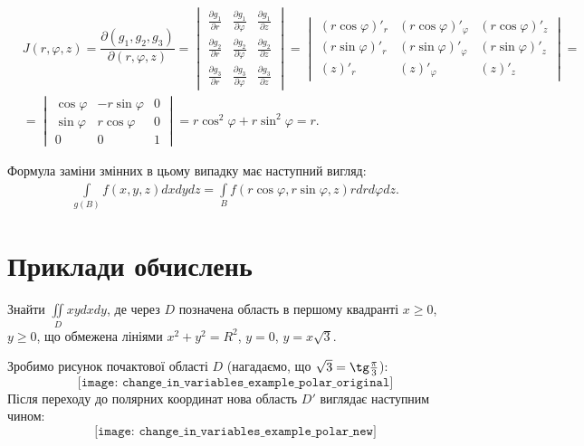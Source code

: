 \begin{align*}
&J(r, \varphi, z) = \dfrac{\partial\left(g_1,g_2,g_3\right)}{\partial\left(r,\varphi,z\right)} =
\begin{vmatrix}
\frac{\partial g_1}{\partial r} & \frac{\partial g_1}{\partial \varphi} & \frac{\partial g_1}{\partial z}\\[6pt]\frac{\partial g_2}{\partial r} & \frac{\partial g_2}{\partial \varphi} & \frac{\partial g_2}{\partial z}\\[6pt]\frac{\partial g_3}{\partial r} & \frac{\partial g_3}{\partial \varphi} & \frac{\partial g_3}{\partial z}
\end{vmatrix}
=
\begin{vmatrix}
\left(r \cos \varphi\right)'_{r} & \left(r \cos \varphi\right)'_{\varphi} & \left(r \cos \varphi\right)'_{z}\\[6pt]
\left(r \sin \varphi\right)'_{r} & \left(r \sin \varphi\right)'_{\varphi} & \left(r \sin \varphi\right)'_{z}\\[6pt]
\left(z \right)'_{r} & \left(z \right)'_{\varphi} & \left(z\right)'_{z}\end{vmatrix} = & \\[6pt]
&=
\begin{vmatrix}
 \cos \varphi & - r \sin \varphi & 0\\[6pt]
 \sin \varphi & r \cos \varphi & 0\\[6pt]
0 & 0 & 1
\end{vmatrix}
= r \cos^2 \varphi + r \sin^2 \varphi = r.
\end{align*}

Формула заміни змінних в цьому випадку має наступний вигляд:
\begin{align*}
\boxed{\int\limits_{g\left(B\right)} f(x, y, z) dx dy dz = \int\limits_{B} f\left(r \cos\varphi, r \sin\varphi, z \right) r dr d\varphi dz.}
\end{align*}
\section{Приклади обчислень}
\begin{example}
Знайти ${\iint\limits_D x y d x d y}$, де через $D$ позначена область в першому квадранті ${x\geq0}$, ${y\geq0}$, що обмежена лініями ${x^2 +y^2 = R^2}$, ${y= 0}$, ${y = x\sqrt{3}}$.
\end{example}
Зробимо рисунок почактової області $D$ (нагадаємо, що ${\sqrt{3} = \tg \frac{\pi}{3}}$):
\[
\texttt{[image: change\_in\_variables\_example\_polar\_original]}
\]
Після переходу до полярних координат нова область $D'$ виглядає наступним чином:
\[
\texttt{[image: change\_in\_variables\_example\_polar\_new]}
\]

